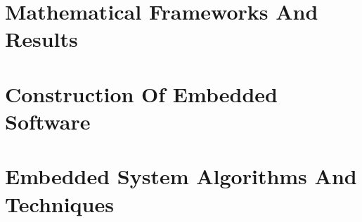 \documentclass[letterpaper,10pt,titlepage]{custbook}
\begin{document}




\part{Mathematical Frameworks And Results}















\part{Construction Of Embedded Software}













\part{Embedded System Algorithms And Techniques}
\end{document}
